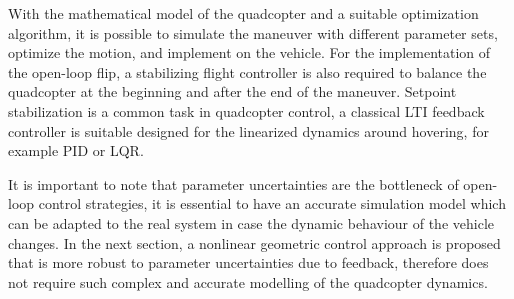

With the mathematical model of the quadcopter and a suitable optimization algorithm, it is possible to simulate the maneuver with different parameter sets, optimize the motion, and implement on the vehicle. For the implementation of the open-loop flip, a stabilizing flight controller is also required to balance the quadcopter at the beginning and after the end of the maneuver. Setpoint stabilization is a common task in quadcopter control, a classical LTI feedback controller is suitable designed for the linearized dynamics around hovering, for example PID or LQR\cite{gym}. 

It is important to note that parameter uncertainties are the bottleneck of open-loop control strategies, it is essential to have an accurate simulation model which can be adapted to the real system in case the dynamic behaviour of the vehicle changes. In the next section, a nonlinear geometric control approach is proposed that is more robust to parameter uncertainties due to feedback, therefore does not require such complex and accurate modelling of the quadcopter dynamics.

